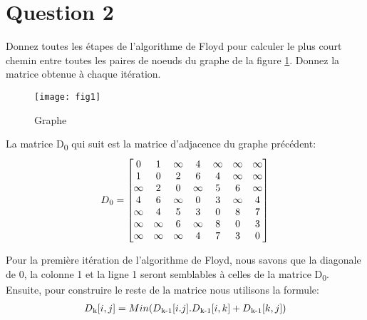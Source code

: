 \documentclass[devoir3.tex]{subfiles}
\begin{document}
\newcommand\hlight[1]{\tikz[overlay, remember picture,baseline=-\the\dimexpr\fontdimen22\textfont2\relax]\node[rectangle,fill=blue!50,rounded corners,fill opacity = 0.2,draw,thick,text opacity =1] {$#1$};} 

\section*{Question 2}
Donnez toutes les étapes de l’algorithme de Floyd pour calculer le plus court chemin entre toutes les paires de noeuds du graphe de la figure \ref{fig:fig1}. Donnez la matrice obtenue à chaque itération.

\begin{figure}[H]
	\centering
	\texttt{[image: fig1]}
	\caption{Graphe}
	\label{fig:fig1}   
\end{figure}

La matrice D\textsubscript{0} qui suit est la matrice d'adjacence du graphe précédent:
\begin{align*}
	D\textsubscript{0} =
	\begin{bmatrix}
		0 	& 1 	  & \infty 	& 4 	  & \infty 	& \infty & \infty \\
		1 	& 0 	  & 2		& 6	  & 4		& \infty & \infty \\
		\infty  & 2 	  & 0 		& \infty & 5 		& 6 	  & \infty \\
		4 	& 6 	  & \infty   	& 0 	  & 3		& \infty & 4 \\
		\infty  & 4 	  & 5 		& 3 	  & 0 	 	& 8 	  & 7 \\
		\infty  & \infty & 6		& \infty & 8 		& 0 	  & 3 \\
		\infty 	& \infty & \infty 	& 4 	  & 7 		& 3 	 & 0
	\end{bmatrix}
\end{align*}

Pour la première itération de l'algorithme de Floyd, nous savons que la diagonale de 0, la colonne 1 et la ligne 1 seront semblables à celles de la matrice D\textsubscript{0}. Ensuite, pour construire le reste de la matrice nous utilisons la formule:
\begin{align*}
	D\textsubscript{k}[i,j] = Min(D\textsubscript{k-1}[i.j]. D\textsubscript{k-1}[i,k] + D\textsubscript{k-1}[k,j])
\end{align*}
\end{document}
